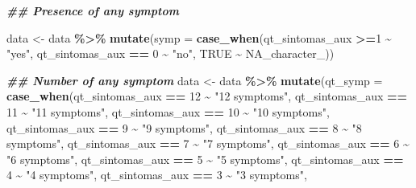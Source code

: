 \documentclass[
]{article}
\newenvironment{Shaded}{\begin{snugshade}}{\end{snugshade}}
\newcommand{\AttributeTok}[1]{\textcolor[rgb]{0.13,0.29,0.53}{#1}}
\newcommand{\ConstantTok}[1]{\textcolor[rgb]{0.56,0.35,0.01}{#1}}
\newcommand{\DecValTok}[1]{\textcolor[rgb]{0.00,0.00,0.81}{#1}}
\newcommand{\DocumentationTok}[1]{\textcolor[rgb]{0.56,0.35,0.01}{\textbf{\textit{#1}}}}
\newcommand{\FunctionTok}[1]{\textcolor[rgb]{0.13,0.29,0.53}{\textbf{#1}}}
\newcommand{\NormalTok}[1]{#1}
\newcommand{\OtherTok}[1]{\textcolor[rgb]{0.56,0.35,0.01}{#1}}
\newcommand{\SpecialCharTok}[1]{\textcolor[rgb]{0.81,0.36,0.00}{\textbf{#1}}}
\newcommand{\StringTok}[1]{\textcolor[rgb]{0.31,0.60,0.02}{#1}}
\begin{document}
\begin{Shaded}
\begin{Highlighting}[]
\DocumentationTok{\#\# Presence of any symptom}

\NormalTok{data }\OtherTok{\textless{}{-}}\NormalTok{  data }\SpecialCharTok{\%\textgreater{}\%}
  \FunctionTok{mutate}\NormalTok{(}\AttributeTok{symp =} \FunctionTok{case\_when}\NormalTok{(qt\_sintomas\_aux }\SpecialCharTok{\textgreater{}=}\DecValTok{1} \SpecialCharTok{\textasciitilde{}} \StringTok{"yes"}\NormalTok{,}
\NormalTok{                              qt\_sintomas\_aux }\SpecialCharTok{==} \DecValTok{0} \SpecialCharTok{\textasciitilde{}} \StringTok{"no"}\NormalTok{,}
                               \ConstantTok{TRUE} \SpecialCharTok{\textasciitilde{}} \ConstantTok{NA\_character\_}\NormalTok{))}

\DocumentationTok{\#\# Number of any symptom}
\NormalTok{data }\OtherTok{\textless{}{-}}\NormalTok{  data }\SpecialCharTok{\%\textgreater{}\%}
  \FunctionTok{mutate}\NormalTok{(}\AttributeTok{qt\_symp =} \FunctionTok{case\_when}\NormalTok{(qt\_sintomas\_aux }\SpecialCharTok{==} \DecValTok{12}  \SpecialCharTok{\textasciitilde{}} \StringTok{"12 symptoms"}\NormalTok{,}
\NormalTok{                                  qt\_sintomas\_aux }\SpecialCharTok{==} \DecValTok{11}  \SpecialCharTok{\textasciitilde{}} \StringTok{"11 symptoms"}\NormalTok{,}
\NormalTok{                                  qt\_sintomas\_aux }\SpecialCharTok{==} \DecValTok{10}  \SpecialCharTok{\textasciitilde{}} \StringTok{"10 symptoms"}\NormalTok{,}
\NormalTok{                                  qt\_sintomas\_aux }\SpecialCharTok{==} \DecValTok{9}  \SpecialCharTok{\textasciitilde{}} \StringTok{"9 symptoms"}\NormalTok{,             }
\NormalTok{                                  qt\_sintomas\_aux }\SpecialCharTok{==} \DecValTok{8}  \SpecialCharTok{\textasciitilde{}} \StringTok{"8 symptoms"}\NormalTok{,}
\NormalTok{                                  qt\_sintomas\_aux }\SpecialCharTok{==} \DecValTok{7}  \SpecialCharTok{\textasciitilde{}} \StringTok{"7 symptoms"}\NormalTok{,}
\NormalTok{                                  qt\_sintomas\_aux }\SpecialCharTok{==} \DecValTok{6}  \SpecialCharTok{\textasciitilde{}} \StringTok{"6 symptoms"}\NormalTok{,}
\NormalTok{                                  qt\_sintomas\_aux }\SpecialCharTok{==} \DecValTok{5}  \SpecialCharTok{\textasciitilde{}} \StringTok{"5 symptoms"}\NormalTok{,}
\NormalTok{                                  qt\_sintomas\_aux }\SpecialCharTok{==} \DecValTok{4}  \SpecialCharTok{\textasciitilde{}} \StringTok{"4 symptoms"}\NormalTok{,}
\NormalTok{                                  qt\_sintomas\_aux }\SpecialCharTok{==} \DecValTok{3}  \SpecialCharTok{\textasciitilde{}} \StringTok{"3 symptoms"}\NormalTok{,}

\end{Highlighting}
\end{Shaded}
\end{document}
